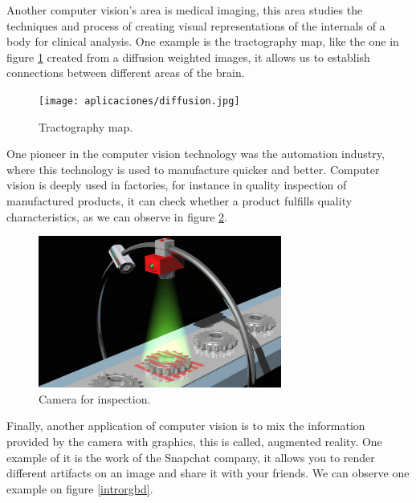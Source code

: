 Another computer vision's area is medical imaging, this area studies the techniques and process of creating visual representations of the internals of a body for clinical analysis. One example is the tractography map, like the one in figure \ref{introTractog} created from a diffusion weighted images, it allows us to establish connections between different areas of the brain.

\begin{figure}[H]
\centering         
\texttt{[image: aplicaciones/diffusion.jpg]}
\caption{Tractography map.} \label{introTractog}
\end{figure}


One pioneer in the computer vision technology was the automation industry, where this technology is used to manufacture quicker and better. Computer vision is deeply used in factories, for instance in quality inspection of manufactured products, it can check whether a product fulfills quality characteristics, as we can observe in figure \ref{introFactory}.

\begin{figure}[H]
\centering         
\includegraphics[width=8cm]{aplicaciones/factory.jpg}
\caption{Camera for inspection.} \label{introFactory}
\end{figure}

%

Finally, another application of computer vision is to mix the information provided by the camera with graphics, this is called, augmented reality. One example of it is the work of the Snapchat company, it allows you to render different artifacts on an image and share it with your friends. We can observe one example on figure \ref{introrgbd}.

